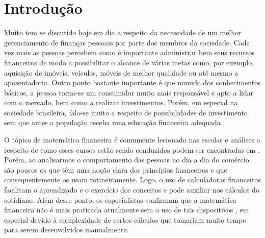 \chapter{Introdução}




Muito tem se discutido hoje em dia a respeito da necessidade de um melhor gerenciamento de finanças pessoais por parte dos membros da sociedade. Cada vez mais as pessoas percebem como é importante administrar bem seus recursos financeiros de modo a possibilitar o alcance de várias metas como, por exemplo, aquisição de imóveis, veículos, móveis de melhor qualidade ou até mesmo a aposentadoria. Outro ponto bastante importante é que munido dos conhecimentos básicos, a pessoa torna-se um consumidor muito mais responsável e apto a lidar com o mercado, bem como a realizar investimentos. Porém, em especial na sociedade brasileira, fala-se muito a respeito de possibilidades de investimento sem que antes a população receba uma educação financeira adequada \cite{valoreducacao}. 

O tópico de matemática financeira é comumente lecionado nas escolas e análises a res\-peito de como esses cursos estão sendo conduzidos podem ser encontradas em \cite{educacaoMedio}. Porém, ao analisarmos o comportamento das pessoas no dia a dia do comércio são poucos os que têm uma noção clara dos princípios financeiros e que consequentemente os usam rotineiramente. Logo, o uso de calculadoras financeiras facilitam o aprendizado e o exercício dos conceitos e pode auxiliar nos cálculos do cotidiano. Além desse ponto, os especialistas confirmam que a matemática financeira não é mais praticada atualmente sem o uso de tais dispositivos \cite{matFinanceira}, em especial devido à complexidade de certos cálculos que tomariam muito tempo para serem desenvolvidos manualmente.

